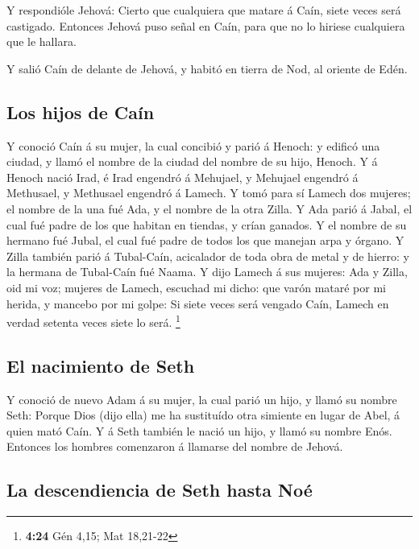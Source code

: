 Y respondióle Jehová: Cierto que cualquiera que matare á
Caín, siete veces será castigado. Entonces Jehová puso señal en Caín,
para que no lo hiriese cualquiera que le hallara.

 Y salió Caín de delante de Jehová, y habitó en tierra de
Nod, al oriente de Edén.

\hypertarget{los-hijos-de-cauxedn}{%
\subsection{Los hijos de Caín}\label{los-hijos-de-cauxedn}}

 Y conoció Caín á su mujer, la cual concibió y parió á
Henoch: y edificó una ciudad, y llamó el nombre de la ciudad del nombre
de su hijo, Henoch.  Y á Henoch nació Irad, é Irad
engendró á Mehujael, y Mehujael engendró á Methusael, y Methusael
engendró á Lamech.  Y tomó para sí Lamech dos mujeres; el
nombre de la una fué Ada, y el nombre de la otra Zilla. 
Y Ada parió á Jabal, el cual fué padre de los que habitan en tiendas, y
crían ganados.  Y el nombre de su hermano fué Jubal, el
cual fué padre de todos los que manejan arpa y órgano.  Y
Zilla también parió á Tubal-Caín, acicalador de toda obra de metal y de
hierro: y la hermana de Tubal-Caín fué Naama.  Y dijo
Lamech á sus mujeres: Ada y Zilla, oid mi voz; mujeres de Lamech,
escuchad mi dicho: que varón mataré por mi herida, y mancebo por mi
golpe:  Si siete veces será vengado Caín, Lamech en
verdad setenta veces siete lo será. \footnote{\textbf{4:24} Gén 4,15;
  Mat 18,21-22}

\hypertarget{el-nacimiento-de-seth}{%
\subsection{El nacimiento de Seth}\label{el-nacimiento-de-seth}}

 Y conoció de nuevo Adam á su mujer, la cual parió un
hijo, y llamó su nombre Seth: Porque Dios (dijo ella) me ha sustituído
otra simiente en lugar de Abel, á quien mató Caín.  Y á
Seth también le nació un hijo, y llamó su nombre Enós. Entonces los
hombres comenzaron á llamarse del nombre de Jehová.

\hypertarget{la-descendiencia-de-seth-hasta-nouxe9}{%
\subsection{La descendiencia de Seth hasta
Noé}\label{la-descendiencia-de-seth-hasta-nouxe9}}

